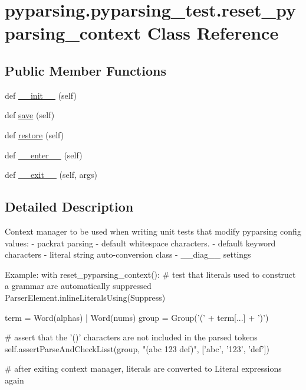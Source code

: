 \hypertarget{classpyparsing_1_1pyparsing__test_1_1reset__pyparsing__context}{}\section{pyparsing.\+pyparsing\+\_\+test.\+reset\+\_\+pyparsing\+\_\+context Class Reference}
\label{classpyparsing_1_1pyparsing__test_1_1reset__pyparsing__context}
\subsection*{Public Member Functions}
\begin{DoxyCompactItemize}
\item 
def \hyperlink{classpyparsing_1_1pyparsing__test_1_1reset__pyparsing__context_af3eb28926b076d7aec92c06276ea3139}{\+\_\+\+\_\+init\+\_\+\+\_\+} (self)
\item 
def \hyperlink{classpyparsing_1_1pyparsing__test_1_1reset__pyparsing__context_ae33e964df4b6d7e87a52a79c3be41d81}{save} (self)
\item 
def \hyperlink{classpyparsing_1_1pyparsing__test_1_1reset__pyparsing__context_ab4dfd7fcafdfc3bba3aeeb8b82a66931}{restore} (self)
\item 
def \hyperlink{classpyparsing_1_1pyparsing__test_1_1reset__pyparsing__context_ae79dc3e722a264b553b3752b2dc126d9}{\+\_\+\+\_\+enter\+\_\+\+\_\+} (self)
\item 
def \hyperlink{classpyparsing_1_1pyparsing__test_1_1reset__pyparsing__context_ac2b0a653249e99b83018cef51a4502be}{\+\_\+\+\_\+exit\+\_\+\+\_\+} (self, args)
\end{DoxyCompactItemize}


\subsection{Detailed Description}
\begin{DoxyVerb}Context manager to be used when writing unit tests that modify pyparsing config values:
 - packrat parsing
 - default whitespace characters.
 - default keyword characters
 - literal string auto-conversion class
 - __diag__ settings

Example:
    with reset_pyparsing_context():
# test that literals used to construct a grammar are automatically suppressed
ParserElement.inlineLiteralsUsing(Suppress)

term = Word(alphas) | Word(nums)
group = Group('(' + term[...] + ')')

# assert that the '()' characters are not included in the parsed tokens
self.assertParseAndCheckLisst(group, "(abc 123 def)", ['abc', '123', 'def'])

    # after exiting context manager, literals are converted to Literal expressions again
\end{DoxyVerb}
 

